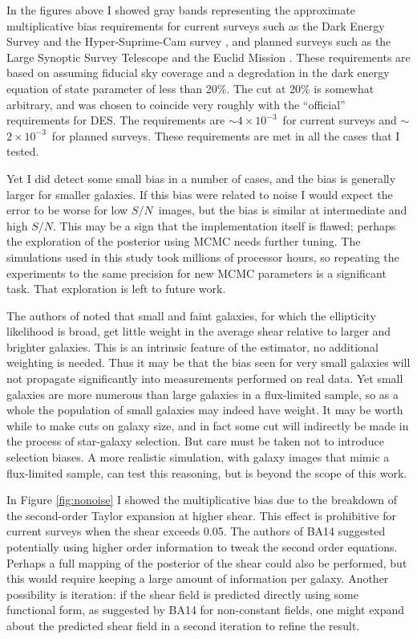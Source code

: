 \documentclass[12pt,preprint]{aastex}
\newcommand{\sn}{$S/N$}
\newcommand{\desreq}{$4\times 10^{-3}$}
\newcommand{\lsstreq}{$2\times 10^{-3}$}
\begin{document}
In the figures above I showed gray bands representing the approximate
multiplicative bias requirements for current surveys such as the Dark Energy
Survey \citep[][DES]{DESWhitePaper} and the Hyper-Suprime-Cam survey
\citep[][HSC]{HSC12}, and planned surveys such as the Large Synoptic Survey
Telescope \citep[][LSST]{IvezicLSST08} and the Euclid Mission
\citep{Euclid2011}.  These requirements are based on
\citep{HutererSystematics06} assuming fiducial sky coverage and a degredation
in the dark energy equation of state parameter of less than 20\%.  The cut at
20\% is somewhat arbitrary, and was chosen to coincide very roughly with the
``official'' requirements for DES. The requirements are $\sim$\desreq\ for
current surveys and $\sim$\lsstreq\ for planned surveys.  These requirements
are met in all the cases that I tested.

Yet I did detect some small bias in a number of cases, and the bias is
generally larger for smaller galaxies.  If this bias were related to noise I
would expect the error to be worse for low \sn\ images, but the bias is similar
at intermediate and high \sn.  This may be a sign that the implementation
itself is flawed; perhaps the exploration of the posterior using MCMC needs
further tuning.  The simulations used in this study took millions of processor
hours, so repeating the experiments to the same precision for new MCMC
parameters is a significant task.  That exploration is left to future work.

The authors of \cite{ba14} noted that small and faint galaxies, for which the
ellipticity likelihood is broad, get little weight in the average shear
relative to larger and brighter galaxies.  This is an intrinsic feature of the
estimator, no additional weighting is needed.  Thus it may be that the bias
seen for very small galaxies will not propagate significantly into measurements
performed on real data.  Yet small galaxies are more numerous than large
galaxies in a flux-limited sample, so as a whole the population of small
galaxies may indeed have weight.  It may be worth while to make cuts on galaxy
size, and in fact some cut will indirectly be made in the process of
star-galaxy selection.  But care must be taken not to introduce selection
biases. A more realistic simulation, with galaxy images that mimic a
flux-limited sample, can test this reasoning, but is beyond the scope of this
work.

In Figure \ref{fig:nonoise} I showed the multiplicative bias due to the
breakdown of the second-order Taylor expansion at higher shear.   This effect
is prohibitive for current surveys when the shear exceeds 0.05.  The authors of
BA14 suggested potentially using higher order information to tweak the second
order equations.  Perhaps a full mapping of the posterior of the shear could
also be performed, but this would require keeping a large amount of information
per galaxy.  Another possibility is iteration: if the shear field is predicted
directly using some functional form, as suggested by BA14 for non-constant
fields, one might expand about the predicted shear field in a second iteration
to refine the result.
\end{document}
